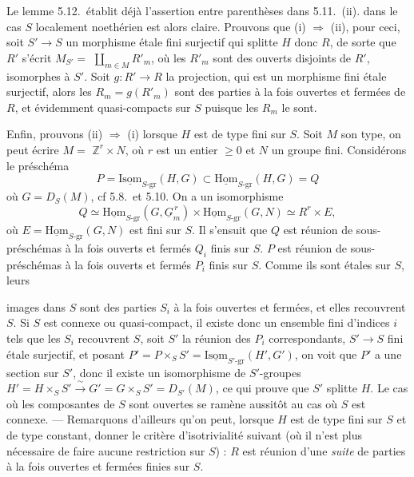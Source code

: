 \documentclass[11pt,a4paper]{article}
\begin{document}
Le lemme 5.12.\ établit déjà l'assertion entre parenthèses dans 5.11.\ (ii).
  dans le cas $S$
localement noethérien est alors claire. Prouvons que (i) $\Longrightarrow$
(ii), pour ceci, soit $S' \to S$ un morphisme étale fini surjectif qui
splitte $H$ donc $R$, de sorte que $R'$ s'écrit 
$M_{S'} =$ \struck{\ill{}} $\coprod_{m \in M} R'_m$, où  les
$R'_m$ sont des ouverts disjoints de $R'$, isomorphes à $S'$. Soit
$g : R' \to R$ la projection, qui est un morphisme fini étale surjectif,
 alors les $R_m = g(R'_m)$ sont
des parties à la fois ouvertes et fermées de $R$, et évidemment
quasi-compacts sur $S$ puisque les $R_m$ le sont.  

Enfin, prouvons (ii) $\Longrightarrow$ (i) lorsque $H$ est de type fini sur
$S$. Soit $M$ son type, on peut écrire $M =$ \struck{\ill{}} $\mathbb{Z}^r
\times N$, où $r$ est un entier $\geqslant 0$ et $N$ un groupe fini.
Considérons le préschéma
\[
P = \underline{\mathrm{Isom}}_{S\text{-gr}}(H,G) \subset
\underline{\mathrm{Hom}}_{S\text{-gr}}(H,G) = Q
\]
où $G = D_S(M)$, cf 5.8.\ et 5.10.  On a un
isomorphisme
\[
Q \simeq \underline{\mathrm{Hom}}_{S\text{-gr}}(G, \underline{G}_m^{\,r})
\times \underline{\mathrm{Hom}}_{S\text{-gr}}(G,N) \simeq R^r \times E,
\]
où $E = \underline{\mathrm{Hom}}_{S\text{-gr}}(G,N)$ est fini sur $S$. Il
s'ensuit que $Q$ est  réunion de sous-préschémas à la
fois ouverts et fermés $Q_i$ finis sur $S$. 
 $P$ est réunion  de  sous-préschémas à
la fois ouverts et fermés $P_i$  finis sur $S$. Comme ils
sont étales sur $S$, leurs

images dans $S$ sont des parties $S_i$ à la fois ouvertes et fermées, et
elles recouvrent $S$. Si $S$ est connexe ou quasi-compact, il existe donc un
ensemble fini d'indices \struck{\ill{}} $i$ tels que les $S_i$ recouvrent
$S$, soit $S'$ la réunion des $P_i$ correspondants,   $S' \to S$   fini étale surjectif, et
posant $P' = P \times_S S' = \underline{\mathrm{Isom}}_{S'\text{-gr}}(H',G')$,
on voit que $P'$ a une section sur $S'$, donc il existe un isomorphisme de
$S'$-groupes $H' = H \times_S S' \xrightarrow{\;\sim\;} G' = G \times_S S' =
D_{S'}(M)$, ce qui prouve que $S'$ splitte $H$. Le cas où les composantes
  de $S$ sont \struck{\ill{}} ouvertes se
ramène aussitôt au cas où $S$ est connexe. --- Remarquons d'ailleurs qu'on
peut, lorsque $H$ est de type fini sur $S$ \struck{\ill{}} et de type
constant, donner le critère d'isotrivialité suivant (où il n'est plus
nécessaire de faire aucune restriction sur $S$) : $R$ est réunion d'une
\emph{suite} de parties à la fois ouvertes et fermées finies sur $S$.
\end{document}
